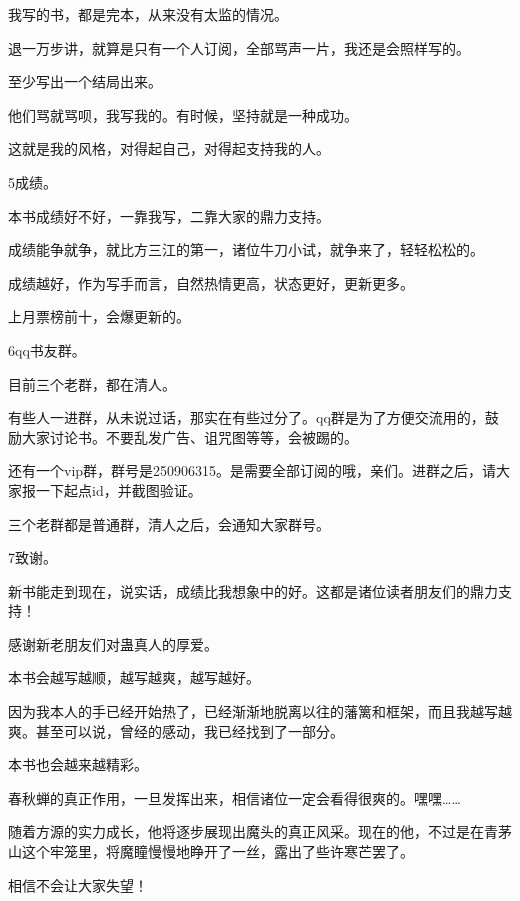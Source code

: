 \begin{this_body}
我写的书，都是完本，从来没有太监的情况。

退一万步讲，就算是只有一个人订阅，全部骂声一片，我还是会照样写的。

至少写出一个结局出来。

他们骂就骂呗，我写我的。有时候，坚持就是一种成功。

这就是我的风格，对得起自己，对得起支持我的人。

5成绩。

本书成绩好不好，一靠我写，二靠大家的鼎力支持。

成绩能争就争，就比方三江的第一，诸位牛刀小试，就争来了，轻轻松松的。

成绩越好，作为写手而言，自然热情更高，状态更好，更新更多。

上月票榜前十，会爆更新的。

6qq书友群。

目前三个老群，都在清人。

有些人一进群，从未说过话，那实在有些过分了。qq群是为了方便交流用的，鼓励大家讨论书。不要乱发广告、诅咒图等等，会被踢的。

还有一个vip群，群号是250906315。是需要全部订阅的哦，亲们。进群之后，请大家报一下起点id，并截图验证。

三个老群都是普通群，清人之后，会通知大家群号。

7致谢。

新书能走到现在，说实话，成绩比我想象中的好。这都是诸位读者朋友们的鼎力支持！

感谢新老朋友们对蛊真人的厚爱。

本书会越写越顺，越写越爽，越写越好。

因为我本人的手已经开始热了，已经渐渐地脱离以往的藩篱和框架，而且我越写越爽。甚至可以说，曾经的感动，我已经找到了一部分。

本书也会越来越精彩。

春秋蝉的真正作用，一旦发挥出来，相信诸位一定会看得很爽的。嘿嘿……

随着方源的实力成长，他将逐步展现出魔头的真正风采。现在的他，不过是在青茅山这个牢笼里，将魔瞳慢慢地睁开了一丝，露出了些许寒芒罢了。

相信不会让大家失望！

\end{this_body}


